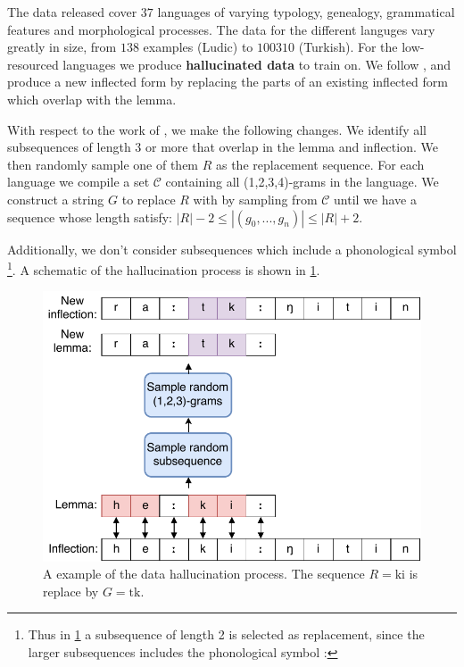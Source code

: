 \documentclass[11pt,a4paper]{article}
\begin{document}
The data released cover $37$ languages of varying typology, genealogy,
grammatical features and morphological processes. The data for the
different languges vary greatly in size, from $138$ examples (Ludic)
to $100310$ (Turkish).  For the low-resourced languages we produce
\textbf{hallucinated data} to train on. We follow
\cite{DBLP:conf/emnlp/AnastasopoulosN19}, and produce a new inflected
form by replacing the parts of an existing inflected form which
overlap with the lemma. 

With respect to the work of \citet{DBLP:conf/emnlp/AnastasopoulosN19},
we make the following changes. We identify all subsequences of length
$3$ or more that overlap in the lemma and inflection. We then randomly
sample one of them $R$ as the replacement sequence. 
For each language we compile a set $\mathcal{C}$ containing all
(1,2,3,4)-grams in the language. We construct a string $G$ to replace
$R$ with by sampling from $\mathcal{C}$ until we have a sequence whose
length satisfy: $|R|-2 \leq |(g_0, ..., g_n)| \leq |R|+2$.



Additionally, we don't consider subsequences which include a
phonological symbol \footnote{Thus in \cref{fig:hall} a subsequence of
length 2 is selected as replacement, since the larger subsequences
includes the phonological symbol :}.  A schematic of the hallucination
process is shown in \cref{fig:hall}.


\begin{figure}[h]
\centering
\includegraphics[scale=0.5]{hall.pdf}
\caption{\label{fig:hall} A example of the data hallucination process. The sequence $R=\text{ki}$ is replace by $G=\text{tk}$.}
\end{figure}
\end{document}
